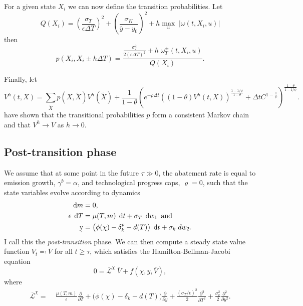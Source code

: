 \documentclass[../../main.tex]{subfiles}
\begin{document}
For a given state $X_i$ we can now define the transition probabilities. Let \begin{equation}
    Q(X_i) = \left(\frac{\sigma_T}{\epsilon \Delta T}\right)^2 + \left(\frac{\sigma_K}{\overline{y} - y_0}\right)^2 + h \max_u \; \lvert \omega(t, X_i, u)  \rvert
\end{equation} then \begin{equation}
    p(X_i, X_i \pm h \Delta T) = \frac{\frac{\sigma^2_T}{2(\epsilon \Delta T)^2} + h \; \omega^{\pm}_T(t, X_i, u)}{Q(X_i)}.
\end{equation}

Finally, let \begin{equation}
    V^h(t, X) = \sum_{\tilde{X}} p(X, \tilde{X}) V^h(\tilde{X}) + \frac{1}{1 - \theta} \left(e^{-\rho \Delta t} ((1 - \theta) V^h(t, X))^{\frac{1 - 1 / \psi}{1 - \theta}} + \Delta t C^{1 - \frac{1}{\psi}} \right)^{\frac{1 - \theta}{1 - 1 / \psi}}.
\end{equation} \citep{kushner_numerical_2001} have shown that the transitional probabilities $p$ form a consistent Markov chain and that $V^h \to V$ as $h \to 0$.

\subsection{Post-transition phase}

We assume that at some point in the future $\tau \gg 0$, the abatement rate is equal to emission growth, $\gamma^b = \alpha$, and technological progress caps, $\varrho = 0$, such that the state variables evolve according to dynamics \begin{align}
    \dd{m} &= 0, \\
    \epsilon \; \dd{T} &= \mu(T, m) \; \dd{t} + \sigma_T \; \dd{w_1} \text{ and } \\
    \d y &= \big( \phi(\chi) - \delta_k^p - d(T) \big) \; \dd{t} + \sigma_k \; d w_2.
\end{align} I call this the \textit{post-transition} phase. We can then compute a steady state value function $V_t \eqqcolon \overline{V}$ for all $t \geq \tau$, which satisfies the Hamilton-Bellman-Jacobi equation \begin{equation}
    0 = \overline{\mathcal{L}}^\chi \; \overline{V} + f(\chi, y, \overline{V}),
\end{equation} where \begin{equation}
    \begin{split}
        \overline{\mathcal{L}}^\chi = \; &\frac{\mu(T, m)}{\epsilon} \frac{\partial}{\partial T} + \Big(\phi(\chi) - \delta_k - d(T) \Big) \frac{\partial}{\partial y} + \frac{(\sigma_T / \epsilon)^2}{2} \frac{\partial^2}{\partial T^2} + \frac{\sigma^2_k}{2} \frac{\partial^2}{\partial y^2}.
    \end{split}
\end{equation}
\end{document}
